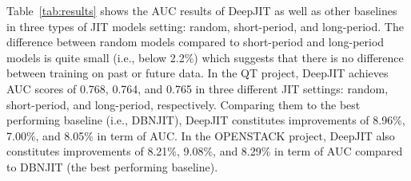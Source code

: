 Table~\ref{tab:results} shows the AUC results of DeepJIT as well as other baselines in three types of JIT models setting: random, short-period, and long-period. The difference between random models compared to short-period and long-period models is quite small (i.e., below 2.2\%) which suggests that there is no difference between training on past or future data.  In the QT project, DeepJIT achieves AUC scores of 0.768, 0.764, and 0.765 in three different JIT settings: random, short-period, and long-period, respectively. Comparing them to the best performing baseline (i.e., DBNJIT), DeepJIT constitutes improvements of 8.96\%, 7.00\%, and 8.05\% in term of AUC. In the OPENSTACK project, DeepJIT also constitutes improvements of 8.21\%, 9.08\%, and 8.29\% in term of AUC compared to DBNJIT (the best performing baseline). 

